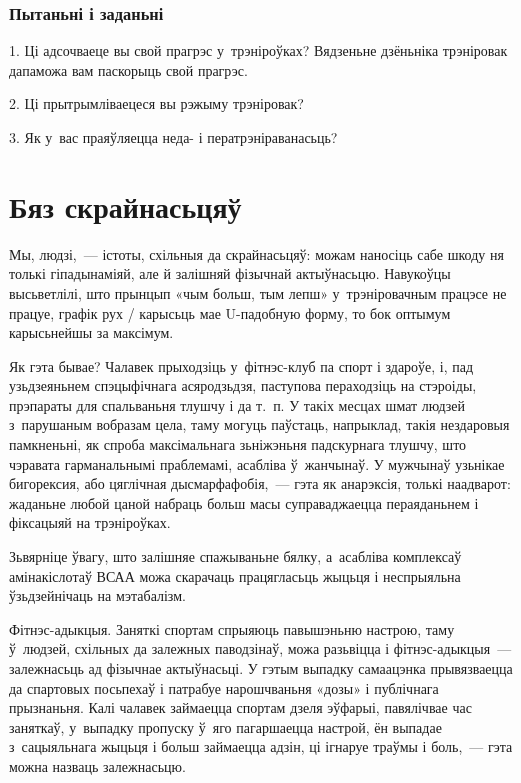 \subsubsection{Пытаньні і заданьні}

1. Ці адсочваеце вы свой прагрэс у~трэніроўках? Вядзеньне дзёньніка трэніровак дапаможа вам паскорыць свой прагрэс.

2. Ці прытрымліваецеся вы рэжыму трэніровак?

3. Як у~вас праяўляецца неда- і ператрэніраванасьць?


\section{Бяз скрайнасьцяў}

Мы, людзі,~--- істоты, схільныя да скрайнасьцяў: можам наносіць сабе шкоду ня толькі гіпадынаміяй, але й залішняй фізычнай актыўнасьцю. Навукоўцы высьветлілі, што прынцып «чым больш, тым лепш» у~трэніровачным працэсе не працуе, графік рух / карысьць мае U-падобную форму, то бок оптымум карысьнейшы за максімум.

Як гэта бывае? Чалавек прыходзіць у~фітнэс-клуб па спорт і здароўе, і, пад узьдзеяньнем спэцыфічнага асяродзьдзя, паступова пераходзіць на стэроіды, прэпараты для спальваньня тлушчу і да т.~п. У такіх месцах шмат людзей з~парушаным вобразам цела, таму могуць паўстаць, напрыклад, такія нездаровыя памкненьні, як спроба максімальнага зьніжэньня падскурнага тлушчу, што чэравата гарманальнымі праблемамі, асабліва ў~жанчынаў. У мужчынаў узьнікае бигорексия, або цяглічная дысмарфафобія,~--- гэта як анарэксія, толькі наадварот: жаданьне любой цаной набраць больш масы суправаджаецца пераяданьнем і фіксацыяй на трэніроўках.

Зьвярніце ўвагу, што залішняе спажываньне бялку, а~асабліва комплексаў амінакіслотаў ВСАА можа скарачаць працягласьць жыцьця і неспрыяльна ўзьдзейнічаць на мэтабалізм.

Фітнэс-адыкцыя. Заняткі спортам спрыяюць павышэньню настрою, таму ў~людзей, схільных да залежных паводзінаў, можа разьвіцца і фітнэс-адыкцыя~--- залежнасьць ад фізычнае актыўнасьці. У гэтым выпадку самаацэнка прывязваецца да спартовых посьпехаў і патрабуе нарошчваньня «дозы» і публічнага прызнаньня. Калі чалавек займаецца спортам дзеля эўфарыі, павялічвае час заняткаў, у~выпадку пропуску ў~яго пагаршаецца настрой, ён выпадае з~сацыяльнага жыцьця і больш займаецца адзін, ці ігнаруе траўмы і боль,~--- гэта можна назваць залежнасьцю.

